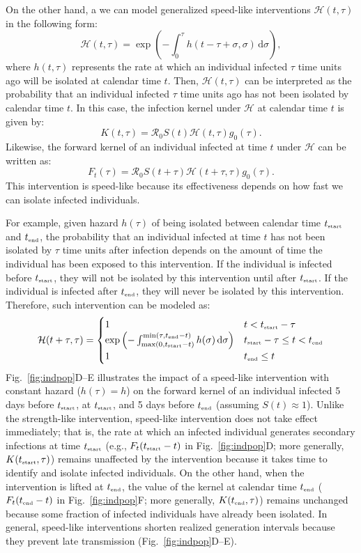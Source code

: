 \documentclass[12pt]{article}
\newcommand{\fref}[1]{Fig.~\ref{fig:#1}}
\newcommand{\Rx}[1]{\ensuremath{{\mathcal R}_{#1}}\xspace}
\newcommand{\Ro}{\Rx{0}}
\newcommand{\tsub}[2]{#1_{{\textrm{\tiny #2}}}}
\newcommand{\dd}[1]{\ensuremath{\, \mathrm{d}#1}}
\newcommand{\dsigma}{\dd{\sigma}}
\newcommand{\tstart}{\ensuremath{\tsub{t}{start}}\xspace}
\newcommand{\tend}{\ensuremath{\tsub{t}{end}}\xspace}
\newcommand{\HH}{\ensuremath{\mathcal H}}
\begin{document}
On the other hand, a we can model generalized speed-like interventions $\HH(t, \tau)$ in the following form:
\begin{equation}
\HH(t, \tau) = \exp \left(- \int_0^\tau h(t-\tau+\sigma, \sigma) \dsigma \right),
\end{equation}
where $h(t, \tau)$ represents the rate at which an individual infected $\tau$ time units ago will be isolated at calendar time $t$.
Then, $\HH(t,\tau)$ can be interpreted as the probability that an individual infected $\tau$ time units ago has not been isolated by calendar time $t$.
In this case, the infection kernel under $\HH$ at calendar time $t$ is given by:
\begin{equation}
K(t, \tau) = \Ro S(t) \HH(t, \tau) g_0(\tau).
\end{equation}
Likewise, the forward kernel of an individual infected at time $t$ under $\HH$ can be written as:
\begin{equation}
F_t(\tau) = \Ro S(t+\tau) \HH(t+\tau, \tau) g_0(\tau).
\end{equation}
This intervention is speed-like because its effectiveness depends on how fast we can isolate infected individuals.

For example, given hazard $h(\tau)$ of being isolated between calendar time \tstart and \tend, the probability that an individual infected at time $t$ has not been isolated by $\tau$ time units after infection depends on the amount of time the individual has been exposed to this intervention.
If the individual is infected before $\tstart$, they will not be isolated by this intervention until after $\tstart$.
If the individual is infected after $\tend$, they will never be isolated by this intervention.
Therefore, such intervention can be modeled as:
\begin{equation}
\HH(t+\tau, \tau) = \begin{cases}
1 & t < \tstart-\tau \\
\exp\left(- \int_{\max(0, \tstart - t)}^{\min(\tau, \tend-t)} h(\sigma)\dd{\sigma} \right) & \tstart-\tau \leq t < \tend \\
1 & \tend \leq t
\end{cases}
\end{equation}
\fref{indpop}D--E illustrates the impact of a speed-like intervention with constant hazard ($h(\tau)=h$) on the forward kernel of an individual infected 5 days before $\tstart$, at $\tstart$, and 5 days before $\tend$ (assuming $S(t) \approx 1$).
Unlike the strength-like intervention, speed-like intervention does not take effect immediately;
that is, the rate at which an infected individual generates secondary infections at time $\tstart$ (e.g., $F_t(\tstart-t)$ in \fref{indpop}D; more generally, $K(\tstart, \tau)$) remains unaffected by the intervention because it takes time to identify and isolate infected individuals.
On the other hand, when the intervention is lifted at $\tend$, the value of the kernel at calendar time $\tend$ ($F_t(\tend-t)$ in \fref{indpop}F; more generally, $K(\tend, \tau)$) remains unchanged because some fraction of infected individuals have already been isolated.
In general, speed-like interventions shorten realized generation intervals because they prevent late transmission (\fref{indpop}D--E).
\end{document}
